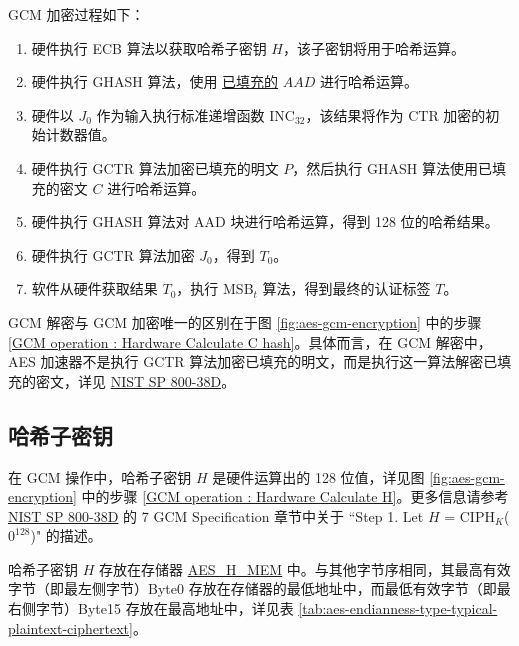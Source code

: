 \documentclass[main\_\_CN.tex]{subfiles}
\begin{document}
GCM 加密过程如下：
\begin{enumerate}
    \item \label{GCM operation : Hardware Calculate H} 硬件执行 ECB 算法以获取哈希子密钥 \hyperref[Label Hash subkey]{$H$}，该子密钥将用于哈希运算。
    \item \label{GCM operation : Hardware Calculate AAD hash} 硬件执行 GHASH 算法，使用 \hyperref[api:textpadding]{已填充的} $AAD$ 进行哈希运算。
    \item \label{GCM operation : Hardware Calculate J0 inc32} 硬件以 \hyperref[Label J0]{$J_{0}$} 作为输入执行标准递增函数 INC$_{32}$，该结果将作为 CTR 加密的初始计数器值。
    \item \label{GCM operation : Hardware Calculate C hash} 硬件执行 GCTR 算法加密已填充的明文 $P$，然后执行 GHASH 算法使用已填充的密文 $C$ 进行哈希运算。
    \item \label{GCM operation : Hardware Calculate padding block hash} 硬件执行 GHASH 算法对 AAD 块进行哈希运算，得到 128 位的哈希结果。
    \item \label{GCM operation : Hardware Calculate T0} 硬件执行 GCTR 算法加密 $J_{0}$，得到 $T_{0}$。
    \item \label{GCM operation : Software Calculate T} 软件从硬件获取结果 $T_{0}$，执行 MSB$_{t}$ 算法，得到最终的认证标签 $T$。
\end{enumerate}

GCM 解密与 GCM 加密唯一的区别在于图 \ref{fig:aes-gcm-encryption} 中的步骤 \ref{GCM operation : Hardware Calculate C hash}。具体而言，在 GCM 解密中，AES 加速器不是执行 GCTR 算法加密已填充的明文，而是执行这一算法解密已填充的密文，详见 \href{https://nvlpubs.nist.gov/nistpubs/Legacy/SP/nistspecialpublication800-38d.pdf}{NIST SP 800-38D}。


\subsection{哈希子密钥}\label{Label Hash subkey}

\label{memdesc:AESHMEM} 在 GCM 操作中，哈希子密钥 $H$ 是硬件运算出的 128 位值，详见图 \ref{fig:aes-gcm-encryption} 中的步骤 \ref{GCM operation : Hardware Calculate H}。更多信息请参考 \href{https://nvlpubs.nist.gov/nistpubs/Legacy/SP/nistspecialpublication800-38d.pdf}{NIST SP 800-38D} 的 7 GCM Specification 章节中关于 ``Step 1. Let $H$ = CIPH$_K$({$0^{128}$})" 的描述。

哈希子密钥 $H$ 存放在存储器 \hyperref[memdesc:AESHMEM]{AES\_H\_MEM} 中。与其他字节序相同，其最高有效字节（即最左侧字节）Byte0 存放在存储器的最低地址中，而最低有效字节（即最右侧字节）Byte15 存放在最高地址中，详见表 \ref{tab:aes-endianness-type-typical-plaintext-ciphertext}。
\end{document}
